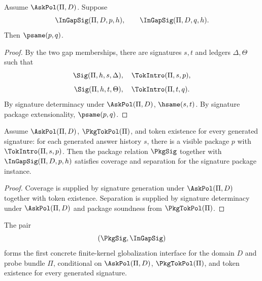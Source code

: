 \begin{lemma}
\label{lem:concrete-gap-separation}
Assume $\AskPol(\Pi,D)$. Suppose
$$
  \InGapSig(\Pi,D,p,h),
  \qquad
  \InGapSig(\Pi,D,q,h).
$$
Then $\psame(p,q)$.
\end{lemma}
\begin{proof}
By the two gap memberships, there are signatures $s,t$ and ledgers $\Delta,\Theta$ such that
$$
  \Sig(\Pi,h,s,\Delta),\quad \TokIntro(\Pi,s,p),
$$
$$
  \Sig(\Pi,h,t,\Theta),\quad \TokIntro(\Pi,t,q).
$$
By signature determinacy under $\AskPol(\Pi,D)$, $\hsame(s,t)$. By signature package extensionality, $\psame(p,q)$.
\end{proof}

\begin{theorem}
\label{thm:concrete-gap-policy}
Assume $\AskPol(\Pi,D)$, $\PkgTokPol(\Pi)$, and token existence for every generated signature: for each generated answer history $s$, there is a visible package $p$ with $\TokIntro(\Pi,s,p)$. Then the package relation $\PkgSig$ together with $\InGapSig(\Pi,D,p,h)$ satisfies coverage and separation for the signature package instance.
\end{theorem}
\begin{proof}
Coverage is supplied by signature generation under $\AskPol(\Pi,D)$ together with token existence. Separation is supplied by signature determinacy under $\AskPol(\Pi,D)$ and package soundness from $\PkgTokPol(\Pi)$.
\end{proof}

\begin{corollary}
\label{cor:first-concrete-globalization-ledger}
The pair
$$
  (\PkgSig,\InGapSig)
$$
forms the first concrete finite-kernel globalization interface for the domain $D$ and probe bundle $\Pi$, conditional on $\AskPol(\Pi,D)$, $\PkgTokPol(\Pi)$, and token existence for every generated signature.
\end{corollary}
